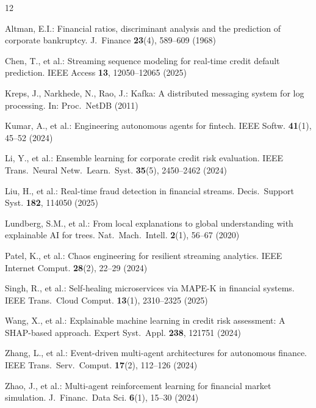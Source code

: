 ﻿\documentclass[runningheads]{llncs}
\begin{document}
\begin{thebibliography}{12}

Altman, E.I.: Financial ratios, discriminant analysis and the prediction of corporate bankruptcy. J.~Finance \textbf{23}(4), 589--609 (1968)

Chen, T., et al.: Streaming sequence modeling for real-time credit default prediction. IEEE Access \textbf{13}, 12050--12065 (2025)

Kreps, J., Narkhede, N., Rao, J.: Kafka: A distributed messaging system for log processing. In: Proc.~NetDB (2011)

Kumar, A., et al.: Engineering autonomous agents for fintech. IEEE Softw. \textbf{41}(1), 45--52 (2024)

Li, Y., et al.: Ensemble learning for corporate credit risk evaluation. IEEE Trans.~Neural Netw.~Learn.~Syst. \textbf{35}(5), 2450--2462 (2024)

Liu, H., et al.: Real-time fraud detection in financial streams. Decis.~Support Syst. \textbf{182}, 114050 (2025)

Lundberg, S.M., et al.: From local explanations to global understanding with explainable AI for trees. Nat.~Mach.~Intell. \textbf{2}(1), 56--67 (2020)

Patel, K., et al.: Chaos engineering for resilient streaming analytics. IEEE Internet Comput. \textbf{28}(2), 22--29 (2024)

Singh, R., et al.: Self-healing microservices via MAPE-K in financial systems. IEEE Trans.~Cloud Comput. \textbf{13}(1), 2310--2325 (2025)

Wang, X., et al.: Explainable machine learning in credit risk assessment: A SHAP-based approach. Expert Syst.~Appl. \textbf{238}, 121751 (2024)

Zhang, L., et al.: Event-driven multi-agent architectures for autonomous finance. IEEE Trans.~Serv.~Comput. \textbf{17}(2), 112--126 (2024)

Zhao, J., et al.: Multi-agent reinforcement learning for financial market simulation. J.~Financ.~Data Sci. \textbf{6}(1), 15--30 (2024)

\end{thebibliography}
\end{document}
